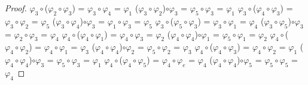 \documentclass[10pt,a4paper,oneside]{article}
\begin{document}
\begin{proof}
					\newline
					$\varphi_{3}\circ$($\varphi_{2}\circ\varphi_{3}$) = $\varphi_{3}\circ\varphi_{4}$ = $\varphi_{1}$
					\newline
					($\varphi_{3}\circ\varphi_{2}$)$\circ\varphi_{3}$ = $\varphi_{5}\circ\varphi_{3}$ = $\varphi_{1}$
					\newline
					\newline
					$\varphi_{3}\circ$($\varphi_{4}\circ\varphi_{3}$) = $\varphi_{3}\circ\varphi_{2}$ = $\varphi_{5}$
					\newline
					($\varphi_{3}\circ\varphi_{4}$)$\circ\varphi_{3}$ = $\varphi_{1}\circ\varphi_{3}$ = $\varphi_{5}$
					\newline
					\newline
					$\varphi_{3}\circ$($\varphi_{5}\circ\varphi_{3}$) = $\varphi_{3}\circ\varphi_{1}$ = $\varphi_{4}$
					\newline
					($\varphi_{3}\circ\varphi_{5}$)$\circ\varphi_{3}$ = $\varphi_{2}\circ\varphi_{3}$ = $\varphi_{4}$
					\newline
					\newline
					$\varphi_{4}\circ$($\varphi_{4}\circ\varphi_{1}$) = $\varphi_{4}\circ\varphi_{3}$ = $\varphi_{2}$
					\newline
					($\varphi_{4}\circ\varphi_{4}$)$\circ\varphi_{1}$ = $\varphi_{5}\circ\varphi_{1}$ = $\varphi_{2}$
					\newline
					\newline
					$\varphi_{4}\circ$($\varphi_{4}\circ\varphi_{2}$) = $\varphi_{4}\circ\varphi_{1}$ = $\varphi_{3}$
					\newline
					($\varphi_{4}\circ\varphi_{4}$)$\circ\varphi_{2}$ = $\varphi_{5}\circ\varphi_{2}$ = $\varphi_{3}$
					\newline
					\newline
					$\varphi_{4}\circ$($\varphi_{4}\circ\varphi_{3}$) = $\varphi_{4}\circ\varphi_{2}$ = $\varphi_{1}$
					\newline
					($\varphi_{4}\circ\varphi_{4}$)$\circ\varphi_{3}$ = $\varphi_{5}\circ\varphi_{3}$ = $\varphi_{1}$
					\newline
					\newline
					$\varphi_{4}\circ$($\varphi_{4}\circ\varphi_{5}$) = $\varphi_{4}\circ\varphi_{e}$ = $\varphi_{4}$
					\newline
					($\varphi_{4}\circ\varphi_{4}$)$\circ\varphi_{5}$ = $\varphi_{5}\circ\varphi_{5}$ = $\varphi_{4}$
					\newline
					\newline

\end{proof}
\end{document}
